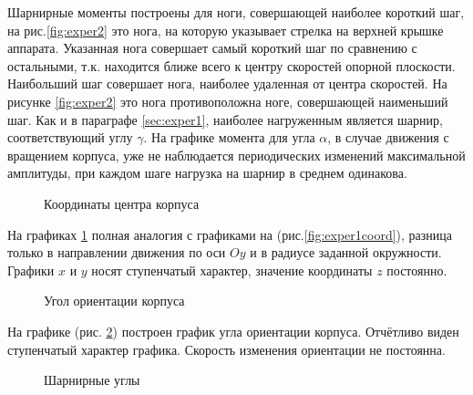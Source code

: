 Шарнирные моменты построены для ноги, совершающей наиболее короткий шаг, на рис.\ref{fig:exper2} это нога, на которую указывает стрелка на верхней крышке аппарата. Указанная нога совершает самый короткий шаг по сравнению с остальными, т.к. находится ближе всего к центру скоростей опорной плоскости. Наибольший шаг совершает нога, наиболее удаленная от центра скоростей. На рисунке \ref{fig:exper2} это нога противоположна ноге, совершающей наименьший шаг.  Как и в параграфе \ref{sec:exper1}, наиболее нагруженным является шарнир, соответствующий углу $\gamma$. На графике момента для угла $\alpha$, в случае движения с вращением корпуса, уже не наблюдается периодических изменений максимальной амплитуды, при каждом шаге нагрузка на шарнир в среднем одинакова.

\newpage
\begin{figure}[t]
\caption{Координаты центра корпуса}
\label{fig:exper2coord}
\end{figure}

На графиках \ref{fig:exper2coord} полная аналогия с графиками на (рис.\ref{fig:exper1coord}), разница только в направлении движения по оси $Oy$ и в радиусе заданной окружности. Графики $x$ и $y$ носят ступенчатый характер, значение координаты $z$ постоянно.

\begin{figure}[h]
\caption{Угол ориентации корпуса}
\label{fig:exper2orient}
\end{figure}

На графике (рис. \ref{fig:exper2orient}) построен график угла ориентации корпуса. Отчётливо виден ступенчатый характер графика. Скорость изменения ориентации не постоянна.  

\newpage
\begin{figure}[t]
\caption{Шарнирные углы}
\end{figure}

